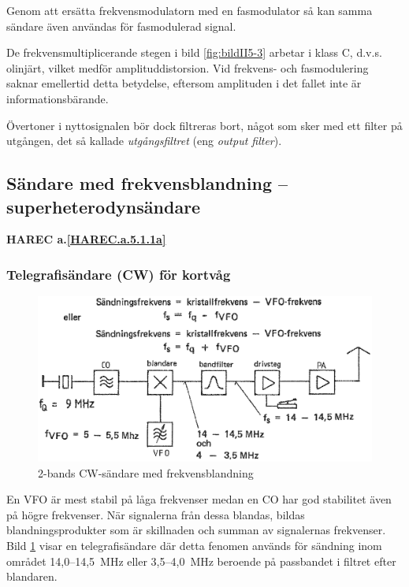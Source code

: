 Genom att ersätta frekvensmodulatorn med en fasmodulator så kan samma
sändare även användas för fasmodulerad signal.

De frekvensmultiplicerande stegen i bild \ref{fig:bildII5-3} arbetar i klass C,
d.v.s. olinjärt, vilket medför amplituddistorsion.
Vid frekvens- och fasmodulering saknar emellertid detta betydelse, eftersom
amplituden i det fallet inte är informationsbärande.

Övertoner i nyttosignalen bör dock filtreras bort, något som sker med ett
filter på utgången, det så kallade \emph{utgångsfiltret}
(eng \emph{output filter}).

\subsection{Sändare med frekvensblandning -- superheterodynsändare}
\textbf{HAREC a.\ref{HAREC.a.5.1.1a}\label{myHAREC.a.5.1.1a}}

\subsubsection{Telegrafisändare (CW) för kortvåg}

\begin{figure}
  \includegraphics[width=\textwidth]{images/cropped_pdfs/bild_2_5-04.pdf}
  \caption{2-bands CW-sändare med frekvensblandning}
  \label{fig:bildII5-4}
\end{figure}

En VFO är mest stabil på låga frekvenser medan en CO har god
stabilitet även på högre frekvenser.
När signalerna från dessa blandas, bildas blandningsprodukter som är
skillnaden och summan av signalernas frekvenser.
Bild \ref{fig:bildII5-4} visar en telegrafisändare där detta fenomen används
för sändning inom området 14,0--14,5~MHz eller 3,5--4,0~MHz beroende
på passbandet i filtret efter blandaren.

